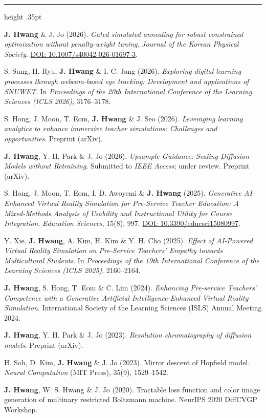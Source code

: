 \documentclass[overlapped,line]{res}
\renewcommand{\sectionfont}{\normalsize\bfseries\scshape\color{cvnavy}}
\renewcommand{\section}[1]{%
  \par\Needspace{4\baselineskip}\addvspace{.105in}%
  \noindent{\sectionfont #1}\par\vspace{.025in}%
  {\color{cvrule}\hrule height .35pt}\vspace{.045in}%
  \nopagebreak[3]}
\newenvironment{cvitems}{
  \begin{list}{}{%
      \setlength{\itemsep}{.062in}
      \setlength{\parsep}{0in}
      \setlength{\parskip}{0in}
      \setlength{\topsep}{.025in}
      \setlength{\partopsep}{0in}
      \setlength{\leftmargin}{.12in}
      \setlength{\rightmargin}{0in}}}{\end{list}}
\begin{document}
\begin{resume}
\section{\sc Papers}
\begin{cvitems}
\item \textbf{J. Hwang} \& J. Jo (2026). \textit{Gated simulated annealing for robust constrained optimization without penalty-weight tuning}. \textit{Journal of the Korean Physical Society}. \href{https://doi.org/10.1007/s40042-026-01697-3}{DOI: 10.1007/s40042-026-01697-3}.
\item S. Sung, H. Ryu, \textbf{J. Hwang} \& I. C. Jang (2026). \textit{Exploring digital learning processes through webcam-based eye tracking: Development and applications of SNUWET}. In \textit{Proceedings of the 20th International Conference of the Learning Sciences (ICLS 2026)}, 3176--3178.
\item S. Hong, J. Moon, T. Eom, \textbf{J. Hwang} \& J. Seo (2026). \textit{Leveraging learning analytics to enhance immersive teacher simulations: Challenges and opportunities}. Preprint (arXiv).
\item \textbf{J. Hwang}, Y. H. Park \& J. Jo (2026). \textit{Upsample Guidance: Scaling Diffusion Models without Retraining}. Submitted to \textit{IEEE Access}; under review. Preprint (arXiv).
\item S. Hong, J. Moon, T. Eom, I. D. Awoyemi \& \textbf{J. Hwang} (2025). \textit{Generative AI-Enhanced Virtual Reality Simulation for Pre-Service Teacher Education: A Mixed-Methods Analysis of Usability and Instructional Utility for Course Integration}. \textit{Education Sciences}, 15(8), 997. \href{https://doi.org/10.3390/educsci15080997}{DOI: 10.3390/educsci15080997}.
\item Y. Xie, \textbf{J. Hwang}, A. Kim, H. Kim \& Y. H. Cho (2025). \textit{Effect of AI-Powered Virtual Reality Simulation on Pre-Service Teachers' Empathy towards Multicultural Students}. In \textit{Proceedings of the 19th International Conference of the Learning Sciences (ICLS 2025)}, 2160--2164.
\item \textbf{J. Hwang}, S. Hong, T. Eom \& C. Lim (2024). \textit{Enhancing Pre-service Teachers' Competence with a Generative Artificial Intelligence-Enhanced Virtual Reality Simulation}. International Society of the Learning Sciences (ISLS) Annual Meeting 2024.
\item \textbf{J. Hwang}, Y. H. Park \& J. Jo (2023). \textit{Resolution chromatography of diffusion models}. Preprint (arXiv).
\item H. Soh, D. Kim, \textbf{J. Hwang} \& J. Jo (2023). Mirror descent of Hopfield model. \textit{Neural Computation} (MIT Press), 35(9), 1529--1542.
\item \textbf{J. Hwang}, W. S. Hwang \& J. Jo (2020). Tractable loss function and color image generation of multinary restricted Boltzmann machine. NeurIPS 2020 DiffCVGP Workshop.
\end{cvitems}


\end{resume}
\end{document}
